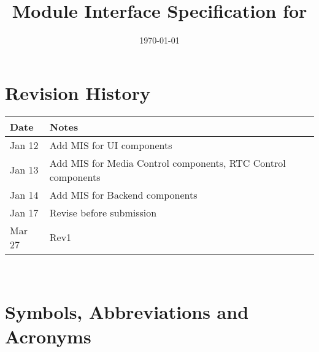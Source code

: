 \documentclass[12pt, titlepage]{article}
\begin{document}
\title{Module Interface Specification for \progname{}}

\author{\authname}

\date{\today}

\maketitle


\section{Revision History}

\begin{tabularx}{\textwidth}{p{3cm}X}
  \toprule
  {\bf Date} & {\bf Notes}                                                  \\
  \midrule
  Jan 12     & Add MIS for UI components                                    \\
  Jan 13     & Add MIS for Media Control components, RTC Control components \\
  Jan 14     & Add MIS for Backend components                               \\
  Jan 17     & Revise before submission                                     \\
  Mar 27     & Rev1                                                         \\
  \bottomrule
\end{tabularx}

~\newpage
\section{Symbols, Abbreviations and Acronyms}
\end{document}
